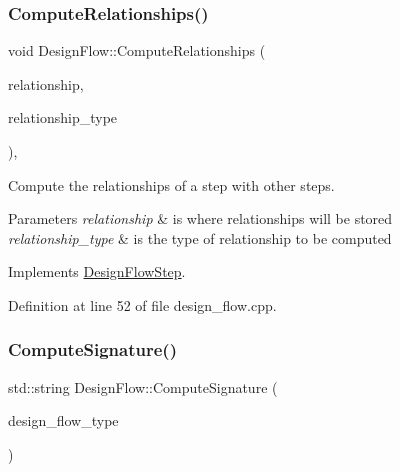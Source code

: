 \subsubsection{\texorpdfstring{Compute\+Relationships()}{ComputeRelationships()}}
{\footnotesize\ttfamily void Design\+Flow\+::\+Compute\+Relationships (\begin{DoxyParamCaption}\item[{\hyperlink{classDesignFlowStepSet}{Design\+Flow\+Step\+Set} \&}]{relationship,  }\item[{const \hyperlink{classDesignFlowStep_a723a3baf19ff2ceb77bc13e099d0b1b7}{Design\+Flow\+Step\+::\+Relationship\+Type}}]{relationship\+\_\+type }\end{DoxyParamCaption})\hspace{0.3cm}{\ttfamily [override]}, {\ttfamily [virtual]}}



Compute the relationships of a step with other steps. 


\begin{DoxyParams}{Parameters}
{\em relationship} & is where relationships will be stored \\
\hline
{\em relationship\+\_\+type} & is the type of relationship to be computed \\
\hline
\end{DoxyParams}


Implements \hyperlink{classDesignFlowStep_a65bf7bcb603189a7ddcf930c3a9fd7fe}{Design\+Flow\+Step}.



Definition at line 52 of file design\+\_\+flow.\+cpp.

\mbox{\label{classDesignFlow_ad4a2c9611b98f3d5108be5ad71a8de63}} 
\subsubsection{\texorpdfstring{Compute\+Signature()}{ComputeSignature()}}
{\footnotesize\ttfamily std\+::string Design\+Flow\+::\+Compute\+Signature (\begin{DoxyParamCaption}\item[{const \hyperlink{design__flow_8hpp_a0701ad2cbf08dc97b38caee3bbbff0c0}{Design\+Flow\+\_\+\+Type}}]{design\+\_\+flow\+\_\+type }\end{DoxyParamCaption})\hspace{0.3cm}{\ttfamily [static]}}



